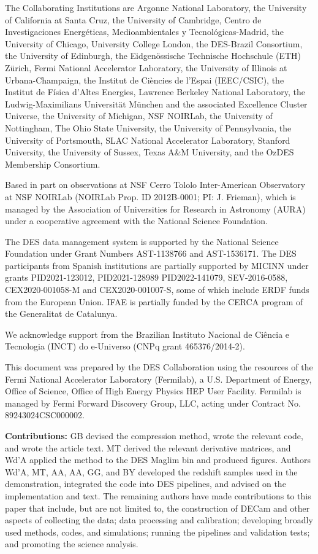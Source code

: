\documentclass[linenumbers, onecolumn]{aastex63}
\begin{document}
\begin{acknowledgments}
The Collaborating Institutions are Argonne National Laboratory, the University of California at Santa Cruz, the University of Cambridge, Centro de Investigaciones Energ{\'e}ticas, 
Medioambientales y Tecnol{\'o}gicas-Madrid, the University of Chicago, University College London, the DES-Brazil Consortium, the University of Edinburgh, 
the Eidgen{\"o}ssische Technische Hochschule (ETH) Z{\"u}rich, 
Fermi National Accelerator Laboratory, the University of Illinois at Urbana-Champaign, the Institut de Ci{\`e}ncies de l'Espai (IEEC/CSIC), 
the Institut de F{\'i}sica d'Altes Energies, Lawrence Berkeley National Laboratory, the Ludwig-Maximilians Universit{\"a}t M{\"u}nchen and the associated Excellence Cluster Universe, 
the University of Michigan, NSF NOIRLab, the University of Nottingham, The Ohio State University, the University of Pennsylvania, the University of Portsmouth, 
SLAC National Accelerator Laboratory, Stanford University, the University of Sussex, Texas A\&M University, and the OzDES Membership Consortium.

Based in part on observations at NSF Cerro Tololo Inter-American Observatory at NSF NOIRLab (NOIRLab Prop. ID 2012B-0001; PI: J. Frieman), which is managed by the Association of Universities for Research in Astronomy (AURA) under a cooperative agreement with the National Science Foundation.

The DES data management system is supported by the National Science Foundation under Grant Numbers AST-1138766 and AST-1536171.
The DES participants from Spanish institutions are partially supported by MICINN under grants PID2021-123012, PID2021-128989 PID2022-141079, SEV-2016-0588, CEX2020-001058-M and CEX2020-001007-S, some of which include ERDF funds from the European Union. IFAE is partially funded by the CERCA program of the Generalitat de Catalunya.

We  acknowledge support from the Brazilian Instituto Nacional de Ci\^encia
e Tecnologia (INCT) do e-Universo (CNPq grant 465376/2014-2).

This document was prepared by the DES Collaboration using the resources of the Fermi National Accelerator Laboratory (Fermilab), a U.S. Department of Energy, Office of Science, Office of High Energy Physics HEP User Facility. Fermilab is managed by Fermi Forward Discovery Group, LLC, acting under Contract No. 89243024CSC000002.
\end{acknowledgments}

\textbf{Contributions:}
GB devised the compression method, wrote the relevant code, and wrote the article text.  MT derived the relevant derivative matrices, and Wd'A applied the method to the DES Maglim bin and produced figures.  Authors Wd'A, MT, AA, AA, GG, and BY developed the redshift samples used in the demonstration, integrated the code into DES pipelines, and advised on the implementation and text.
The remaining authors have made contributions to this paper that include, but
are not limited to, the construction of DECam and other aspects of collecting the data; data
processing and calibration; developing broadly used methods, codes, and simulations; running
the pipelines and validation tests; and promoting the science analysis.
\end{document}
